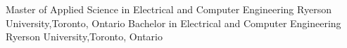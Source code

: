 %
%
%



\begin{scholarship}
				{Master of Applied Science in Electrical and Computer Engineering}
				{Ryerson University,Toronto, Ontario}
				{Bachelor in Electrical and Computer Engineering}
				{Ryerson University,Toronto, Ontario}
\end{scholarship}